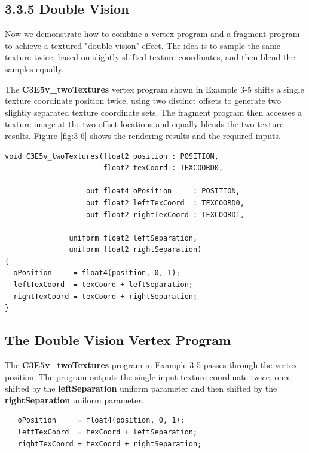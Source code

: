 \documentclass{book}
\begin{document}
\subsection{3.3.5 Double Vision}

Now we demonstrate how to combine a vertex program and a fragment program to achieve a textured "double vision" effect. The idea is to sample the same texture twice, based on slightly shifted texture coordinates, and then blend the samples equally.

The \textbf{C3E5v_twoTextures} vertex program shown in Example 3-5 shifts a single texture coordinate position twice, using two distinct offsets to generate two slightly separated texture coordinate sets. The fragment program then accesses a texture image at the two offset locations and equally blends the two texture results. Figure \ref{fig:3-6} shows the rendering results and the required inputs.

\FloatBarrier
\begin{lstlisting}[caption=Example 3-5. The \textbf{C3E5v_twoTextures} Vertex Program]
void C3E5v_twoTextures(float2 position : POSITION,
                       float2 texCoord : TEXCOORD0,

                   out float4 oPosition     : POSITION,
                   out float2 leftTexCoord  : TEXCOORD0,
                   out float2 rightTexCoord : TEXCOORD1,

               uniform float2 leftSeparation,
               uniform float2 rightSeparation)
{
  oPosition     = float4(position, 0, 1);
  leftTexCoord  = texCoord + leftSeparation;
  rightTexCoord = texCoord + rightSeparation;
}
\end{lstlisting}
\FloatBarrier

\subsection*{The Double Vision Vertex Program}

The \textbf{C3E5v_twoTextures} program in Example 3-5 passes through the vertex position. The program outputs the single input texture coordinate twice, once shifted by the \textbf{leftSeparation} uniform parameter and then shifted by the \textbf{rightSeparation} uniform parameter.

\FloatBarrier
\begin{lstlisting}
   oPosition     = float4(position, 0, 1);
   leftTexCoord  = texCoord + leftSeparation;
   rightTexCoord = texCoord + rightSeparation;
\end{lstlisting}
\FloatBarrier
\end{document}
